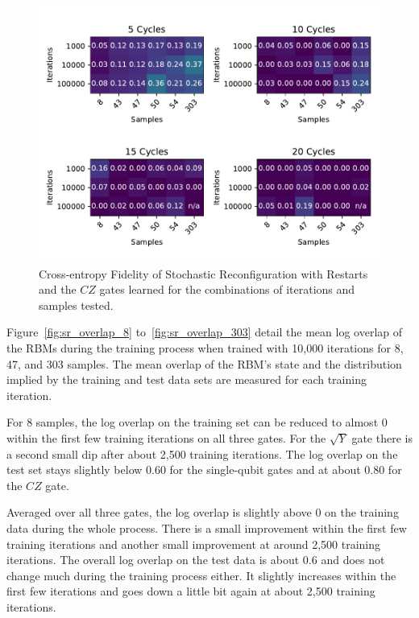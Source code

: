 \begin{figure}[H]
  \centering
  \includegraphics[width=\textwidth]{figures/results/SR-restarts-learned/fxeb_heatmap.pdf}
  \caption[Cross-entropy Fidelity of Stochastic Reconfiguration with Restarts Learned]{Cross-entropy Fidelity of Stochastic 
  Reconfiguration with Restarts and the $CZ$ gates learned for the combinations of iterations and samples tested.}
  \label{fig:sr_fxeb}
\end{figure}

Figure~\ref{fig:sr_overlap_8} to~\ref{fig:sr_overlap_303} detail the mean log overlap of the RBMs during the 
training process when trained with 10,000 iterations for 8, 47, and 303 samples. The 
mean overlap of the RBM's state and the distribution implied by the training and test data sets are measured 
for each training iteration.

For 8 samples, the log overlap on the training set can be reduced to almost 0 within the first few training iterations 
on all three gates. For the $\sqrt{Y}$ gate there is a second small dip after about 2,500 training iterations. 
The log overlap on the test set stays slightly below $0.60$ for the single-qubit gates and at about $0.80$ for the 
$CZ$ gate. 

Averaged over all three gates, the log overlap is slightly above $0$ on the training data during the whole process. There is a small 
improvement within the first few training iterations and another small improvement at around 2,500 training iterations. 
The overall log overlap on the test data is about $0.6$ and does not change much during the training process either. It 
slightly increases within the first few iterations and goes down a little bit again at about 2,500 training iterations.

